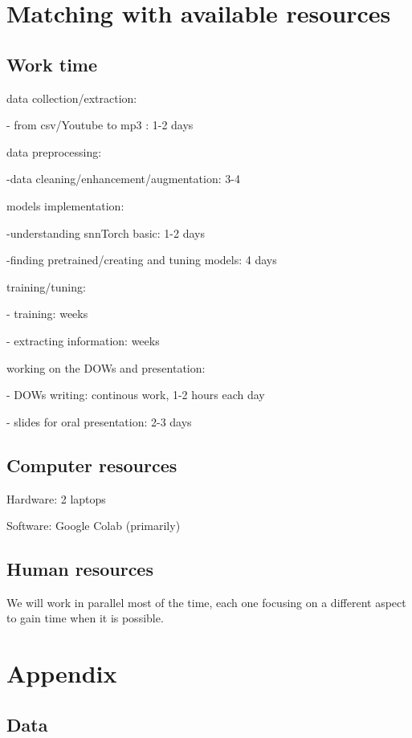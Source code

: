 \documentclass[11pt]{article}
\begin{document}
\section{Matching with available resources}
\subsection{Work time}

data collection/extraction:

- from csv/Youtube to mp3 : 1-2 days

data preprocessing:

-data cleaning/enhancement/augmentation: 3-4

models implementation:

-understanding snnTorch basic: 1-2 days

-finding pretrained/creating and tuning models: 4 days

training/tuning:

- training: weeks

- extracting information: weeks

working on the DOWs and presentation:

- DOWs writing: continous work, 1-2 hours each day

- slides for oral presentation: 2-3 days

\subsection{Computer resources}

Hardware: 2 laptops

Software: Google Colab (primarily)

\subsection{Human resources}

We will work in parallel most of the time, each one focusing on a different aspect to gain time when it is possible.

\pagebreak

\section{Appendix}

\subsection{Data}
\end{document}
